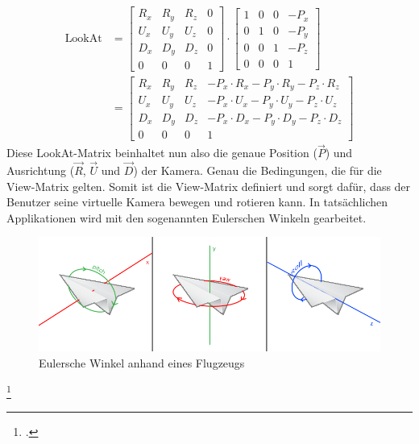 \documentclass[titlepage, 11pt, a4paper, ngerman]{article}
\begin{document}
\begin{align*}
    \text{LookAt} &=
    \begin{bmatrix}
    R_{x} & R_{y} & R_{z} & 0 \\
    U_{x} & U_{y} & U_{z} & 0 \\
    D_{x} & D_{y} & D_{z} & 0 \\
    0 & 0 & 0 & 1
    \end{bmatrix} \cdot
    \begin{bmatrix}
    1 & 0 & 0 & -P_{x} \\
    0 & 1 & 0 & -P_{y} \\
    0 & 0 & 1 & -P_{z} \\
    0 & 0 & 0 & 1
    \end{bmatrix} \\ &=
    \begin{bmatrix}
    R_{x} & R_{y} & R_{z} & -P_{x} \cdot R_{x} - P_{y} \cdot R_{y} - P_{z} \cdot R_{z} \\
    U_{x} & U_{y} & U_{z} & -P_{x} \cdot U_{x} - P_{y} \cdot U_{y} - P_{z} \cdot U_{z} \\
    D_{x} & D_{y} & D_{z} & -P_{x} \cdot D_{x} - P_{y} \cdot D_{y} - P_{z} \cdot D_{z} \\
    0 & 0 & 0 & 1
    \end{bmatrix}
\end{align*}
\bigbreak
Diese LookAt-Matrix beinhaltet nun also die genaue Position ($\vec{P}$) und Ausrichtung ($\vec{R}$, $\vec{U}$ und $\vec{D}$) der Kamera. Genau die Bedingungen, die für die View-Matrix gelten. Somit ist die View-Matrix definiert und sorgt dafür, dass der Benutzer seine virtuelle Kamera bewegen und rotieren kann. In tatsächlichen Applikationen wird mit den sogenannten Eulerschen Winkeln gearbeitet.
\begin{figure}[ht]
    \centering
    \includegraphics[scale=0.4]{res/euler-angles2.png}
    \caption[Eulersche Winkel anhand eines Flugzeugs]{Eulersche Winkel anhand eines Flugzeugs\footnotemark}
    \label{fig:euler-angles}
\end{figure}
\footcitetext{logl-camera}
\end{document}
